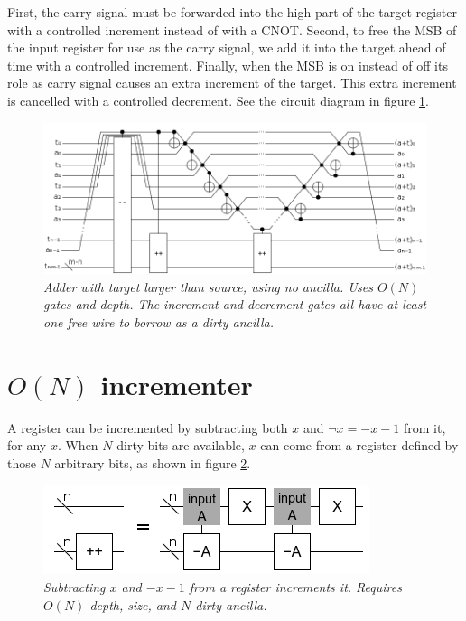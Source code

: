 \documentclass[twocolumn]{article}
\begin{document}
First, the carry signal must be forwarded into the high part of the target register with a controlled increment instead of with a CNOT.
Second, to free the MSB of the input register for use as the carry signal, we add it into the target ahead of time with a controlled increment.
Finally, when the MSB is on instead of off its role as carry signal causes an extra increment of the target.
This extra increment is cancelled with a controlled decrement.
See the circuit diagram in figure \ref{fig:inline-adder-into-large}.

\begin{figure}
  \centering
  \includegraphics[totalheight=3cm]{inline-adder-into-large.png}
  \caption{\em
      Adder with target larger than source, using no ancilla.
      Uses $O(N)$ gates and depth.
      The increment and decrement gates all have at least one free wire to borrow as a dirty ancilla.}
  \label{fig:inline-adder-into-large}
\end{figure}

\section{$O(N)$ incrementer}

A register can be incremented by subtracting both $x$ and $\neg x = -x-1$ from it, for any $x$.
When $N$ dirty bits are available, $x$ can come from a register defined by those $N$ arbitrary bits, as shown in figure \ref{fig:double-sub-increment}.

\begin{figure}
  \centering
  \includegraphics[totalheight=2cm]{double-sub-increment.png}
  \caption{\em Subtracting $x$ and $-x-1$ from a register increments it. Requires $O(N)$ depth, size, and $N$ dirty ancilla.}
  \label{fig:double-sub-increment}
\end{figure}
\end{document}

